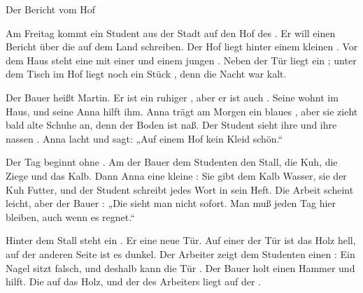 \documentclass[12pt]{nextbook}
\begin{document}
\begin{readersection}{Der Bericht vom Hof}

Am Freitag kommt ein Student aus der Stadt auf den Hof des . Er will einen Bericht über die  auf dem Land schreiben. Der Hof liegt hinter einem kleinen . Vor dem Haus steht eine  mit einer  und einem jungen . Neben der Tür liegt ein ; unter dem Tisch im Hof liegt noch ein Stück , denn die Nacht war kalt.

Der Bauer heißt Martin. Er ist ein ruhiger , aber er ist auch . Seine  wohnt im Haus, und seine  Anna hilft ihm. Anna trägt am Morgen ein blaues , aber sie zieht bald alte Schuhe an, denn der Boden ist naß. Der Student sieht ihre  und ihre nassen . Anna lacht und sagt: „Auf einem Hof  kein Kleid  schön.“

Der Tag beginnt ohne . Am   der Bauer dem Studenten den Stall, die Kuh, die Ziege und das Kalb. Dann  Anna eine kleine : Sie gibt dem Kalb Wasser, sie  der Kuh Futter, und der Student schreibt jedes Wort in sein Heft. Die Arbeit scheint leicht, aber der Bauer : „Die  sieht man nicht sofort. Man muß jeden Tag hier bleiben, auch wenn es regnet.“

Hinter dem Stall steht ein . Er  eine neue Tür. Auf einer  der Tür ist das Holz hell, auf der anderen Seite ist es dunkel. Der Arbeiter zeigt dem Studenten einen : Ein Nagel sitzt falsch, und deshalb kann die Tür . Der Bauer holt einen Hammer und hilft. Die   auf das Holz, und der  des Arbeiters liegt  auf der .


\end{readersection}
\end{document}
